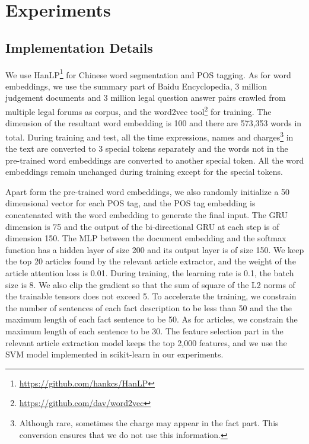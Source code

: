 \section{Experiments}
\subsection{Implementation Details}
We use HanLP\footnote{\url{https://github.com/hankcs/HanLP}} for Chinese word segmentation and POS tagging. As for word embeddings, we use the summary part of Baidu Encyclopedia, 3 million judgement documents and 3 million legal question answer pairs crawled from multiple legal forums as corpus, and the word2vec tool\footnote{\url{https://github.com/dav/word2vec}} for training. The dimension of the resultant word embedding is 100 and there are 573,353 words in total. During training and test, all the time expressions, names and charges\footnote{Although rare, sometimes the charge may appear in the fact part. This conversion ensures that we do not use this information.} in the text are converted to 3 special tokens separately and the words not in the pre-trained word embeddings are converted to another special token. All the word embeddings remain unchanged during training except for the special tokens. 

Apart form the pre-trained word embeddings, we also randomly initialize a 50 dimensional vector for each POS tag, and the POS tag embedding is concatenated with the word embedding to generate the final input. The GRU dimension is 75 and the output of the bi-directional GRU at each step is of dimension 150. The MLP between the document embedding and the softmax function has a hidden layer of size 200 and its output layer is of size 150. We keep the top 20 articles found by the relevant article extractor, and the weight of the article attention loss is 0.01. During training, the learning rate is 0.1, the batch size is 8. We also clip the gradient so that the sum of square of the L2 norms of the trainable tensors does not exceed 5. To accelerate the training, we constrain the number of sentences of each fact description to be less than 50 and the the maximum length of each fact sentence to be 50. As for articles, we constrain the maximum length of each sentence to be 30. The feature selection part in the relevant article extraction model keeps the top 2,000 features, and we use the SVM model implemented in scikit-learn \cite{scikit-learn} in our experiments.


